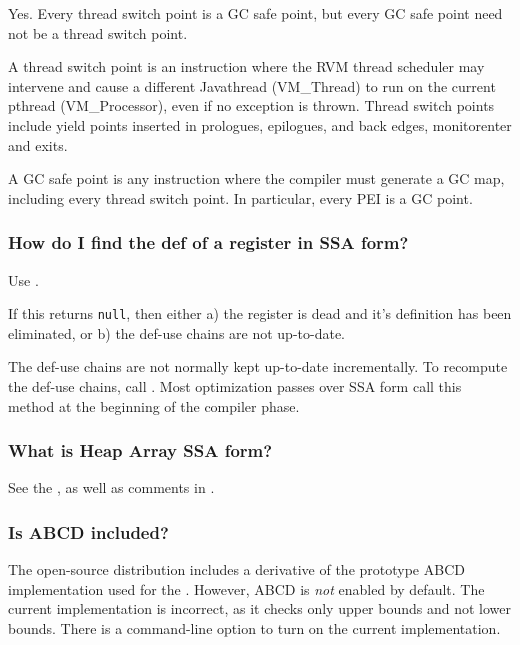 Yes.  Every thread switch point is a GC safe point, but every GC safe point 
need not be a thread switch point.

A thread switch point is an instruction where the RVM thread scheduler may
intervene and cause a different Java\JavaTMFootnote thread (VM\_Thread) to
run on the current 
pthread (VM\_Processor), even if no exception is thrown.  
Thread switch points include yield points inserted in prologues, epilogues, 
and back edges, monitorenter and exits.

A GC safe point is any instruction where the compiler must generate a GC map, 
including every thread switch point.  In particular, every 
PEI is a GC point.

\subsubsection{How do I find the def of a register in SSA form?}

Use 
.

If this returns {\tt null}, then either a) the register is dead and it's definition has been eliminated, 
or b) the def-use chains are not up-to-date.

The def-use chains are not normally kept up-to-date incrementally.  To
recompute the def-use chains, call 
. 
Most optimization passes over SSA form call this method at 
the beginning of the compiler phase.

\subsubsection{What is Heap Array SSA form?}

See the , as well as comments in
.

\subsubsection{Is ABCD included?}

The open-source distribution includes a derivative of the prototype ABCD 
implementation used for the 
.
However, ABCD is {\em not} enabled by default.  The current implementation
is incorrect, as it checks only upper bounds and not lower bounds.
There is a command-line option to turn on the current implementation.

